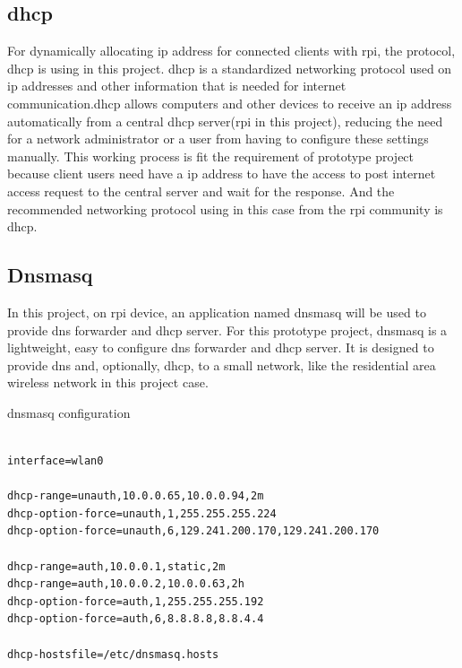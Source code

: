 \subsection{\gls{dhcp}}
\par For dynamically allocating \gls{ip} address for connected clients with \gls{rpi}, the protocol, \gls{dhcp} \cite{dhcp} is using in this project. \gls{dhcp} is a standardized networking protocol used on \gls{ip} addresses and other information that is needed for internet communication.\gls{dhcp} allows computers and other devices to receive an \gls{ip} address automatically from a central \gls{dhcp} server(\gls{rpi} in this project), reducing the need for a network administrator or a user from having to configure these settings manually. This working process is fit the requirement of prototype project because client users need have a \gls{ip} address to have the access to post internet access request to the central server and wait for the response. And the recommended networking protocol using in this case from the \gls{rpi} community is \gls{dhcp}.
\subsection{Dnsmasq}
\par In this project, on \gls{rpi} device, an application named dnsmasq \cite{dnsmasq} will be used to provide \gls{dns} forwarder and \gls{dhcp} server. For this prototype project, dnsmasq is a lightweight, easy to configure \gls{dns} forwarder and \gls{dhcp} server. It is designed to provide \gls{dns} and, optionally, \gls{dhcp}, to a small network, like the residential area wireless network in this project case.

\begin{algorithm}[h]
  \caption{dnsmasq configuration}
  \label{code:dnsmasq_config}
  \begin{verbatim}
  
interface=wlan0

dhcp-range=unauth,10.0.0.65,10.0.0.94,2m
dhcp-option-force=unauth,1,255.255.255.224
dhcp-option-force=unauth,6,129.241.200.170,129.241.200.170

dhcp-range=auth,10.0.0.1,static,2m
dhcp-range=auth,10.0.0.2,10.0.0.63,2h
dhcp-option-force=auth,1,255.255.255.192
dhcp-option-force=auth,6,8.8.8.8,8.8.4.4

dhcp-hostsfile=/etc/dnsmasq.hosts
 \end{verbatim}
\end{algorithm}

